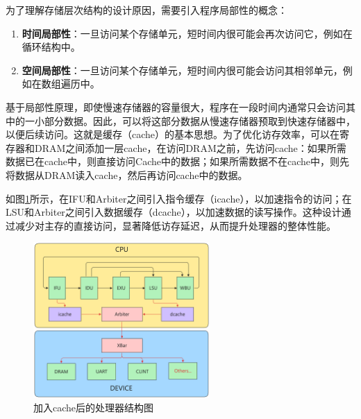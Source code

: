 为了理解存储层次结构的设计原因，需要引入程序局部性的概念：
\begin{enumerate}[label={\arabic*)}, itemsep=0pt, parsep=0pt]
	\item \textbf{时间局部性}：一旦访问某个存储单元，短时间内很可能会再次访问它，例如在循环结构中。
	\item \textbf{空间局部性}：一旦访问某个存储单元，短时间内很可能会访问其相邻单元，例如在数组遍历中。
\end{enumerate}


基于局部性原理，即使慢速存储器的容量很大，程序在一段时间内通常只会访问其中的一小部分数据。因此，可以将这部分数据从慢速存储器预取到快速存储器中，以便后续访问。这就是缓存（cache）的基本思想。为了优化访存效率，可以在寄存器和DRAM之间添加一层cache，在访问DRAM之前，先访问cache：如果所需数据已在cache中，则直接访问Cache中的数据；如果所需数据不在cache中，则先将数据从DRAM读入cache，然后再访问cache中的数据。

如图\ref{fig:cache_cpu}所示，在IFU和Arbiter之间引入指令缓存（icache），以加速指令的访问；在LSU和Arbiter之间引入数据缓存（dcache），以加速数据的读写操作。这种设计通过减少对主存的直接访问，显著降低访存延迟，从而提升处理器的整体性能。

\begin{figure}[htbp]
	\centering
	\includegraphics[width=0.6\textwidth]{image/cache_cpu.pdf}
	\caption{加入cache后的处理器结构图}
	\label{fig:cache_cpu}
\end{figure}

